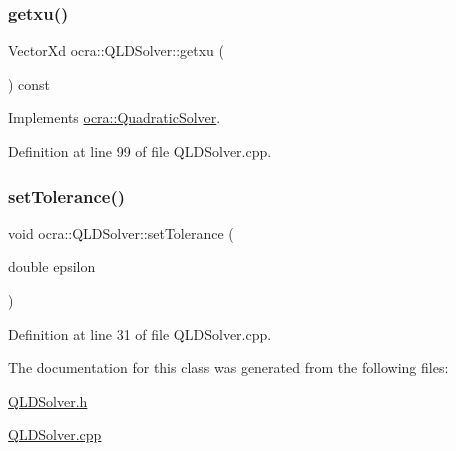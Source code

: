 \subsubsection{\texorpdfstring{getxu()}{getxu()}}
{\footnotesize\ttfamily Vector\+Xd ocra\+::\+Q\+L\+D\+Solver\+::getxu (\begin{DoxyParamCaption}{ }\end{DoxyParamCaption}) const\hspace{0.3cm}{\ttfamily [virtual]}}



Implements \hyperlink{classocra_1_1QuadraticSolver_a58cb3039938bc2a6c9c0e1042425a98b}{ocra\+::\+Quadratic\+Solver}.



Definition at line 99 of file Q\+L\+D\+Solver.\+cpp.

\hypertarget{classocra_1_1QLDSolver_ad14fc2be094603279ccf271e48e5dbe7}{}\label{classocra_1_1QLDSolver_ad14fc2be094603279ccf271e48e5dbe7} 
\subsubsection{\texorpdfstring{set\+Tolerance()}{setTolerance()}}
{\footnotesize\ttfamily void ocra\+::\+Q\+L\+D\+Solver\+::set\+Tolerance (\begin{DoxyParamCaption}\item[{double}]{epsilon }\end{DoxyParamCaption})}



Definition at line 31 of file Q\+L\+D\+Solver.\+cpp.



The documentation for this class was generated from the following files\+:\begin{DoxyCompactItemize}
\item 
\hyperlink{QLDSolver_8h}{Q\+L\+D\+Solver.\+h}\item 
\hyperlink{QLDSolver_8cpp}{Q\+L\+D\+Solver.\+cpp}\end{DoxyCompactItemize}
